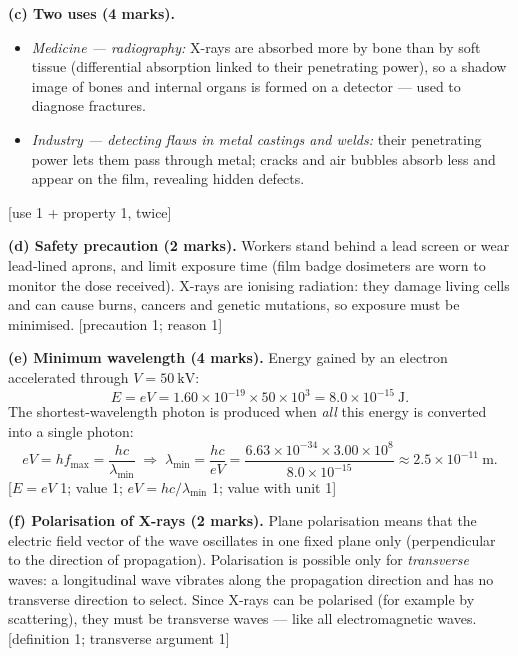 \documentclass[11pt]{article}
\begin{document}
\begin{corrige}
\textbf{(c) Two uses (4 marks).}
\begin{itemize}
\item \emph{Medicine — radiography:} X-rays are absorbed more by bone than by soft tissue (differential absorption linked to their penetrating power), so a shadow image of bones and internal organs is formed on a detector — used to diagnose fractures.
\item \emph{Industry — detecting flaws in metal castings and welds:} their penetrating power lets them pass through metal; cracks and air bubbles absorb less and appear on the film, revealing hidden defects.
\end{itemize}
\hfill [use 1 + property 1, twice]

\textbf{(d) Safety precaution (2 marks).}
Workers stand behind a lead screen or wear lead-lined aprons, and limit exposure time (film badge dosimeters are worn to monitor the dose received). X-rays are ionising radiation: they damage living cells and can cause burns, cancers and genetic mutations, so exposure must be minimised. \hfill [precaution 1; reason 1]

\textbf{(e) Minimum wavelength (4 marks).}
Energy gained by an electron accelerated through $V = 50\ \mathrm{kV}$:
\[ E = eV = 1.60\times10^{-19}\times 50\times10^{3} = 8.0\times10^{-15}\ \mathrm{J}. \]
The shortest-wavelength photon is produced when \emph{all} this energy is converted into a single photon:
\[ eV = hf_{\max} = \frac{hc}{\lambda_{\min}} \;\Rightarrow\; \lambda_{\min} = \frac{hc}{eV} = \frac{6.63\times10^{-34}\times 3.00\times10^{8}}{8.0\times10^{-15}} \approx 2.5\times10^{-11}\ \mathrm{m}. \]
\hfill [$E = eV$ 1; value 1; $eV = hc/\lambda_{\min}$ 1; value with unit 1]

\textbf{(f) Polarisation of X-rays (2 marks).}
Plane polarisation means that the electric field vector of the wave oscillates in one fixed plane only (perpendicular to the direction of propagation). Polarisation is possible only for \emph{transverse} waves: a longitudinal wave vibrates along the propagation direction and has no transverse direction to select. Since X-rays can be polarised (for example by scattering), they must be transverse waves — like all electromagnetic waves. \hfill [definition 1; transverse argument 1]
\end{corrige}
\end{document}
